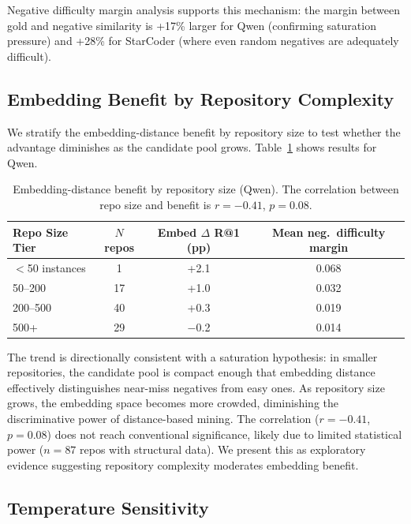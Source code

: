 \documentclass[11pt,a4paper]{article}
\begin{document}
Negative difficulty margin analysis supports this mechanism: the margin between gold and negative similarity is +17\% larger for Qwen (confirming saturation pressure) and +28\% for StarCoder (where even random negatives are adequately difficult).

\subsection{Embedding Benefit by Repository Complexity}
\label{sec:complexity}

We stratify the embedding-distance benefit by repository size to test whether the advantage diminishes as the candidate pool grows. Table~\ref{tab:complexity} shows results for Qwen.

\begin{table}[t]
\centering
\small
\begin{tabular}{lccc}
\toprule
\textbf{Repo Size Tier} & \textbf{$N$ repos} & \textbf{Embed $\Delta$ R@1 (pp)} & \textbf{Mean neg.\ difficulty margin} \\
\midrule
$<$50 instances & 1 & +2.1 & 0.068 \\
50--200 & 17 & +1.0 & 0.032 \\
200--500 & 40 & +0.3 & 0.019 \\
500+ & 29 & $-$0.2 & 0.014 \\
\bottomrule
\end{tabular}
\caption{Embedding-distance benefit by repository size (Qwen). The correlation between repo size and benefit is $r = -0.41$, $p = 0.08$.}
\label{tab:complexity}
\end{table}

The trend is directionally consistent with a saturation hypothesis: in smaller repositories, the candidate pool is compact enough that embedding distance effectively distinguishes near-miss negatives from easy ones. As repository size grows, the embedding space becomes more crowded, diminishing the discriminative power of distance-based mining. The correlation ($r = -0.41$, $p = 0.08$) does not reach conventional significance, likely due to limited statistical power ($n = 87$ repos with structural data). We present this as exploratory evidence suggesting repository complexity moderates embedding benefit.

\subsection{Temperature Sensitivity}
\label{sec:temperature}
\end{document}
